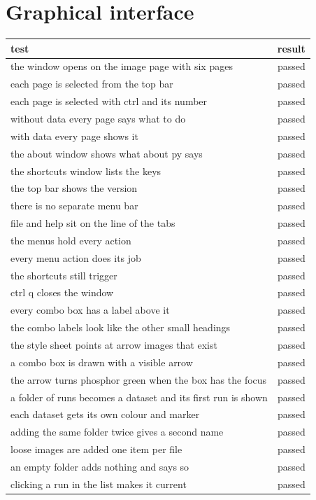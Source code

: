 \documentclass[10pt,a4paper]{article}
\begin{document}
\section{Graphical interface}
\begin{longtable}{@{}p{}r@{}}
\toprule
test & result \\
\midrule
\endhead
the window opens on the image page with six pages & passed \\
each page is selected from the top bar & passed \\
each page is selected with ctrl and its number & passed \\
without data every page says what to do & passed \\
with data every page shows it & passed \\
the about window shows what about py says & passed \\
the shortcuts window lists the keys & passed \\
the top bar shows the version & passed \\
there is no separate menu bar & passed \\
file and help sit on the line of the tabs & passed \\
the menus hold every action & passed \\
every menu action does its job & passed \\
the shortcuts still trigger & passed \\
ctrl q closes the window & passed \\
every combo box has a label above it & passed \\
the combo labels look like the other small headings & passed \\
the style sheet points at arrow images that exist & passed \\
a combo box is drawn with a visible arrow & passed \\
the arrow turns phosphor green when the box has the focus & passed \\
a folder of runs becomes a dataset and its first run is shown & passed \\
each dataset gets its own colour and marker & passed \\
adding the same folder twice gives a second name & passed \\
loose images are added one item per file & passed \\
an empty folder adds nothing and says so & passed \\
clicking a run in the list makes it current & passed \\

\end{longtable}
\end{document}
